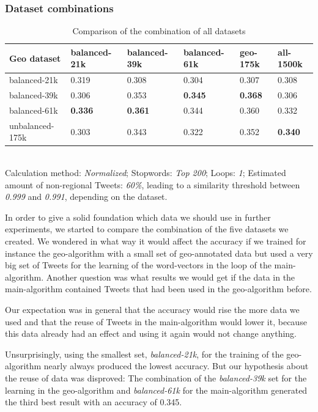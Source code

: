 \documentclass[../Main.tex]{subfiles}
\begin{document}
\subsubsection{Dataset combinations}
\begin{table}[b]
    \begin{tabular}{|l|lllll|}
    \hline
    Geo dataset     & balanced-21k & balanced-39k & balanced-61k & geo-175k & all-1500k \\ \hline
    balanced-21k    & 0.319        & 0.308        & 0.304        & 0.307           & 0.308       \\
    balanced-39k    & 0.306        & 0.353       & \textbf{0.345}        & \textbf{0.368 }          & 0.306       \\
    balanced-61k    & \textbf{0.336}        & \textbf{0.361}        & 0.344        &0.360           & 0.332       \\
    unbalanced-175k & 0.303        & 0.343        & 0.322        & 0.352           & \textbf{0.340}       \\ \hline
    \end{tabular} \\

  Calculation method: \textit{Normalized}; Stopwords: \textit{Top 200}; Loops: \textit{1}; Estimated amount of non-regional Tweets: \textit{60\%}, leading to a similarity threshold between \textit{0.999} and \textit{0.991}, depending on the dataset.
  \caption{Comparison of the combination of all datasets}
  \label{geo_datasets}
\end{table}

In order to give a solid foundation which data we should use in further experiments, we started to compare the combination of the five datasets we created. We wondered in what way it would affect the accuracy if we trained for instance the geo-algorithm with a small set of geo-annotated data but used a very big set of Tweets for the learning of the word-vectors in the loop of the main-algorithm. Another question was what results we would get if the data in the main-algorithm contained Tweets that had been used in the geo-algorithm before. 

Our expectation was in general that the accuracy would rise the more data we used and that the reuse of Tweets in the main-algorithm would lower it, because this data already had an effect and using it again would not change anything.

Unsurprisingly, using the smallest set, \emph{balanced-21k}, for the training of the geo-algorithm nearly always produced the lowest accuracy. But our hypothesis about the reuse of data was disproved: The combination of the \emph{balanced-39k} set for the learning in the geo-algorithm and \emph{balanced-61k} for the main-algorithm generated the third best result with an accuracy of 0.345.
\end{document}
